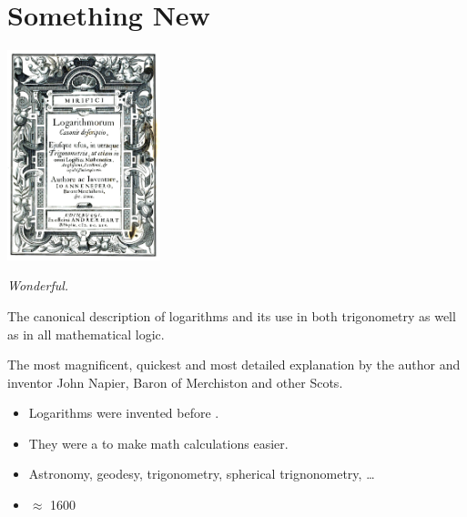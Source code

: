 \section*{Something New}

\begin{minipage}{0.25\textwidth}
    \includegraphics[width=1.75in]{Logarithms_book_Napier}
\end{minipage}
\hfil 
\begin{minipage}{0.7\textwidth}
    {\itshape
    Wonderful.

    The canonical description of logarithms 
    and its use in both trigonometry as well as in all mathematical logic.

    The most magnificent, quickest and most detailed explanation by the
    author and inventor 
    John Napier, Baron of Merchiston and other Scots.
    }
    \begin{itemize}[fullwidth]
        \item Logarithms were invented before .
        \item They were a  to make math calculations easier.
        \item Astronomy, geodesy, trigonometry, spherical trignonometry, \dots
        \item $\approx$ 1600
    \end{itemize}
\end{minipage}
\hfil 

